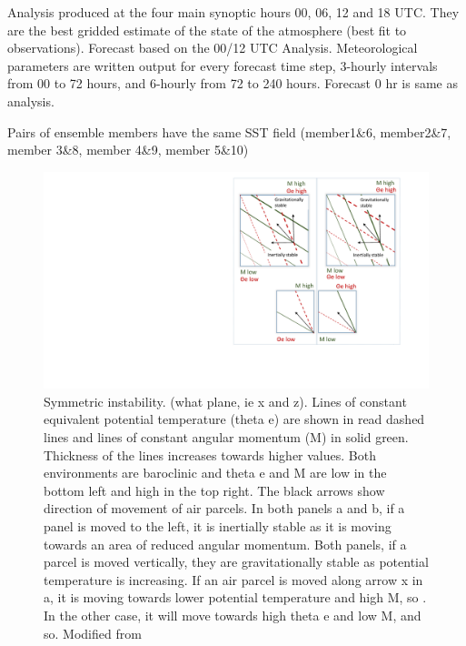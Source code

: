 Analysis produced at the four main synoptic hours 00, 06, 12 and 18 UTC. They are the best gridded estimate of the state of the atmosphere (best fit to observations). 
Forecast based on the 00/12 UTC Analysis. Meteorological parameters are written output for every forecast time step, 3-hourly intervals from 00 to 72 hours, and 6-hourly from 72 to 240 hours. Forecast 0 hr is same as analysis.

Pairs of ensemble members have the same SST field (member1\&6, member2\&7, member 3\&8, member 4\&9, member 5\&10)


\begin{figure}
	
	\includegraphics[width=38pc,angle=0]{mocrette_diagram.pdf}
	\caption{Symmetric instability. (what plane, ie x and z). Lines of constant equivalent potential temperature (theta e)  are shown in read dashed lines and lines of constant angular momentum (M) in solid green. Thickness of the lines increases towards  higher values. Both environments are baroclinic and theta e and M are low in the bottom left and high in the top right. The black arrows show direction of movement of air parcels. In both panels a and b, if a panel is moved to the left, it is inertially stable as it is moving towards an area of reduced angular momentum. Both panels, if a parcel is moved vertically, they are gravitationally stable as potential temperature is increasing. If an air parcel is moved along arrow x in a, it is moving towards lower potential temperature and high M, so . In the other case, it will move towards high theta e and low M, and so. Modified from \cite{morcrette2004radar}}\label{fig:symm_inst}
	\centering
\end{figure}


